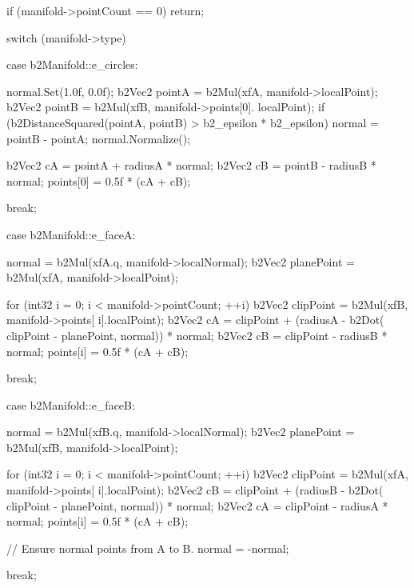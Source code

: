 \begin{DoxyCode}
{
        if (manifold->pointCount == 0)
        {
                return;
        }

        switch (manifold->type)
        {
        case b2Manifold::e_circles:
                {
                        normal.Set(1.0f, 0.0f);
                        b2Vec2 pointA = b2Mul(xfA, manifold->localPoint);
                        b2Vec2 pointB = b2Mul(xfB, manifold->points[0].
      localPoint);
                        if (b2DistanceSquared(pointA, pointB) > b2_epsilon * 
      b2_epsilon)
                        {
                                normal = pointB - pointA;
                                normal.Normalize();
                        }

                        b2Vec2 cA = pointA + radiusA * normal;
                        b2Vec2 cB = pointB - radiusB * normal;
                        points[0] = 0.5f * (cA + cB);
                }
                break;

        case b2Manifold::e_faceA:
                {
                        normal = b2Mul(xfA.q, manifold->localNormal);
                        b2Vec2 planePoint = b2Mul(xfA, manifold->localPoint);

                        for (int32 i = 0; i < manifold->pointCount; ++i)
                        {
                                b2Vec2 clipPoint = b2Mul(xfB, manifold->points[
      i].localPoint);
                                b2Vec2 cA = clipPoint + (radiusA - b2Dot(
      clipPoint - planePoint, normal)) * normal;
                                b2Vec2 cB = clipPoint - radiusB * normal;
                                points[i] = 0.5f * (cA + cB);
                        }
                }
                break;

        case b2Manifold::e_faceB:
                {
                        normal = b2Mul(xfB.q, manifold->localNormal);
                        b2Vec2 planePoint = b2Mul(xfB, manifold->localPoint);

                        for (int32 i = 0; i < manifold->pointCount; ++i)
                        {
                                b2Vec2 clipPoint = b2Mul(xfA, manifold->points[
      i].localPoint);
                                b2Vec2 cB = clipPoint + (radiusB - b2Dot(
      clipPoint - planePoint, normal)) * normal;
                                b2Vec2 cA = clipPoint - radiusA * normal;
                                points[i] = 0.5f * (cA + cB);
                        }

                        // Ensure normal points from A to B.
                        normal = -normal;
                }
                break;
        }
}
\end{DoxyCode}


